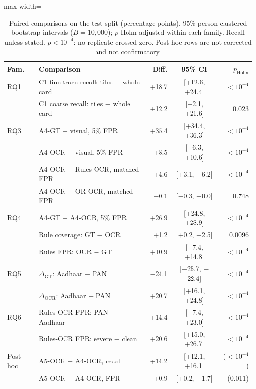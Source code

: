 \documentclass[12pt]{article}
\begin{document}
\begin{table}[H]
\caption{Paired comparisons on the test split (percentage points). 95\% person-clustered bootstrap intervals ($B=10{,}000$); $p$ Holm-adjusted within each family. Recall unless stated. $p<10^{-4}$: no replicate crossed zero. Post-hoc rows are not corrected and not confirmatory.}
\label{tab:tests}
\centering
\scriptsize
\setlength{\tabcolsep}{2.4pt}
\renewcommand{\arraystretch}{1.06}
\begin{adjustbox}{max width=\linewidth}
\begin{tabular}{@{}l l r c r@{}}
\toprule
Fam. & Comparison & Diff. & 95\% CI & $p_{\mathrm{Holm}}$ \\
\midrule
RQ1 & C1 fine-trace recall: tiles $-$ whole card & +18.7 & [+12.6, +24.4] & $<\!10^{-4}$ \\
 & C1 coarse recall: tiles $-$ whole card & +12.2 & [+2.1, +21.6] & 0.023 \\
\addlinespace[1.5pt]
RQ3 & A4-GT $-$ visual, 5\% FPR & +35.4 & [+34.4, +36.3] & $<\!10^{-4}$ \\
 & A4-OCR $-$ visual, 5\% FPR & +8.5 & [+6.3, +10.6] & $<\!10^{-4}$ \\
 & A4-OCR $-$ Rules-OCR, matched FPR & +4.6 & [+3.1, +6.2] & $<\!10^{-4}$ \\
 & A4-OCR $-$ OR-OCR, matched FPR & $-$0.1 & [$-$0.3, +0.0] & 0.748 \\
\addlinespace[1.5pt]
RQ4 & A4-GT $-$ A4-OCR, 5\% FPR & +26.9 & [+24.8, +28.9] & $<\!10^{-4}$ \\
 & Rule coverage: GT $-$ OCR & +1.2 & [+0.2, +2.5] & 0.0096 \\
 & Rules FPR: OCR $-$ GT & +10.9 & [+7.4, +14.8] & $<\!10^{-4}$ \\
\addlinespace[1.5pt]
RQ5 & $\Delta_{\mathrm{GT}}$: Aadhaar $-$ PAN & $-$24.1 & [$-$25.7, $-$22.4] & $<\!10^{-4}$ \\
 & $\Delta_{\mathrm{OCR}}$: Aadhaar $-$ PAN & +20.7 & [+16.1, +24.8] & $<\!10^{-4}$ \\
\addlinespace[1.5pt]
RQ6 & Rules-OCR FPR: PAN $-$ Aadhaar & +14.4 & [+7.4, +23.0] & $<\!10^{-4}$ \\
 & Rules-OCR FPR: severe $-$ clean & +20.6 & [+15.0, +26.7] & $<\!10^{-4}$ \\
\addlinespace[4pt]
Post-hoc & A5-OCR $-$ A4-OCR, recall & +14.2 & [+12.1, +16.1] & ($<\!10^{-4}$) \\
 & A5-OCR $-$ A4-OCR, FPR & +0.9 & [+0.2, +1.7] & (0.011) \\
\bottomrule
\end{tabular}
\end{adjustbox}
\end{table}
\end{document}
